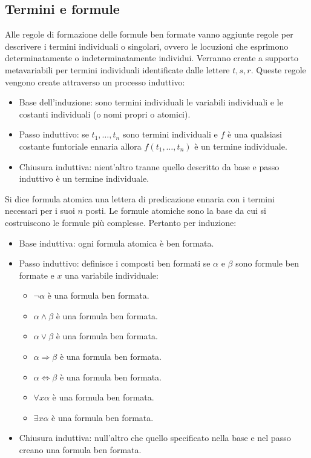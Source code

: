 \subsection{Termini e formule}
Alle regole di formazione delle formule ben formate vanno aggiunte regole per descrivere i termini individuali o singolari, ovvero le locuzioni che esprimono determinatamente o indeterminatamente individui. 
Verranno create a supporto metavariabili per termini individuali identificate dalle lettere $t, s, r$. Queste regole vengono create attraverso un processo induttivo: 
\begin{itemize}
\item Base dell'induzione: sono termini individuali le variabili individuali e le costanti individuali (o nomi propri o atomici).
\item Passo induttivo: se $t_1,\dots, t_n$ sono termini individuali e $f$ \`e una qualsiasi costante funtoriale ennaria allora $f(t_1,\dots, t_n)$ \`e un
termine individuale.
\item Chiusura induttiva: nient'altro tranne quello descritto da base e passo induttivo \`e un termine individuale. 
\end{itemize}
Si dice formula atomica una lettera di predicazione ennaria con i termini necessari per i suoi $n$ posti. Le formule atomiche sono la base da cui si costruiscono le formule pi\`u complesse. Pertanto per 
induzione:
\begin{itemize}
\item Base induttiva: ogni formula atomica \`e ben formata.
\item Passo induttivo: definisce i composti ben formati se $\alpha$ e $\beta$ sono formule ben formate e $x$ una variabile individuale:
\begin{itemize}
\item $\neg\alpha$ \`e una formula ben formata.
\item $\alpha\land\beta$ \`e una formula ben formata.
\item $\alpha\lor\beta$ \`e una formula ben formata.
\item $\alpha\Rightarrow\beta$ \`e una formula ben formata.
\item $\alpha\Leftrightarrow\beta$ \`e una formula ben formata.
\item $\forall x\alpha$ \`e una formula ben formata.
\item $\exists x\alpha$ \`e una formula ben formata.
\end{itemize}
\item Chiusura induttiva: null'altro che quello specificato nella base e nel passo creano una formula ben formata.
\end{itemize}
